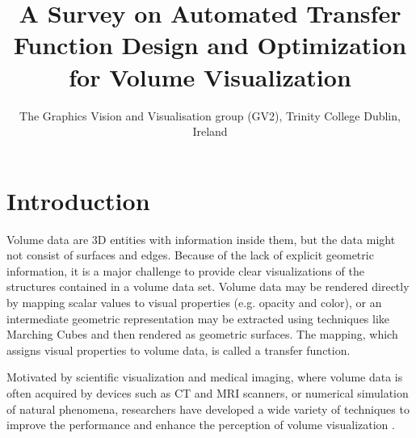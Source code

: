 \documentclass{egpubl}
\title%
{
A Survey on Automated Transfer Function Design and Optimization for Volume Visualization}
\author{
The Graphics Vision and Visualisation group (GV2), Trinity College Dublin, Ireland
}
\begin{document}
	
	
\maketitle

%	
%	

\section{Introduction}
Volume data are 3D entities with information inside them, but the data might not consist of surfaces and edges.
Because of the lack of explicit geometric information, %
it is a major challenge to provide clear visualizations of the structures contained in a volume data set.
Volume data may be rendered directly by mapping scalar values to visual properties (e.g. opacity and color), or an intermediate geometric representation may be extracted using techniques like Marching Cubes \cite{lorensen_marching_1987} and then rendered as geometric surfaces. The mapping, which assigns visual properties to volume data, is called a transfer function.

Motivated by scientific visualization and medical imaging, where volume data is often acquired by devices such as CT and MRI scanners, or numerical simulation of natural phenomena, researchers have developed a wide variety of techniques to improve the performance and enhance the perception of volume visualization \cite{corcoran_enhancing_2013}.
\end{document}
